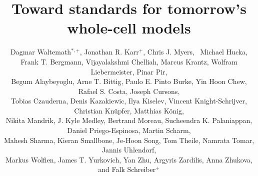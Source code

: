 \documentclass[journal,transmag]{IEEEtran}
\begin{document}
\nocite{IEEEBSTcontrol}

\title{Toward standards for tomorrow's whole-cell models}

\author{
    Dagmar Waltemath$^{*,+}$,
    Jonathan R. Karr$^+$, 
    Chris J. Myers,~
    Michael Hucka,\\
    Frank T. Bergmann,
    Vijayalakshmi Chelliah,
   Marcus Krantz,
    Wolfram Liebermeister,
   Pinar Pir,\\
    Begum Alaybeyoglu,
    Arne T. Bittig,
    Paulo E. Pinto Burke, 
    Yin Hoon Chew,
    Rafael S. Costa,
    Joseph Cursons, \\
    Tobias Czauderna,
    Denis Kazakiewic, 
    Ilya Kiselev,
    Vincent Knight-Schrijver,
    Christian Kn\"{u}pfer,
    Matthias K\"{o}nig,\\
    Nikita Mandrik,
    J. Kyle Medley,
    Bertrand Moreau, 
    Sucheendra K. Palaniappan,
    Daniel Priego-Espinosa, 
    Martin Scharm,\\
    Mahesh Sharma,
    Kieran Smallbone,
    Je-Hoon Song,
    Tom Theile,
    Namrata Tomar, 
    Jannis Uhlendorf,\\
    Markus Wolfien,
    James T. Yurkovich,
    Yan Zhu, 
    Argyris Zardilis, 
    Anna Zhukova, and
    Falk Schreiber$^+$\\
	
}
\end{document}
